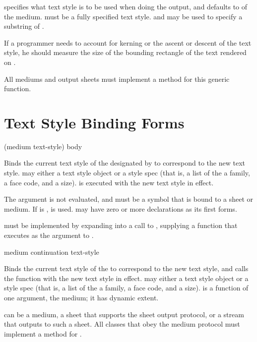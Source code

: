  specifies what text style is to be used when doing the output,
and defaults to  of the medium.  
must be a fully specified text style.   and  may be used to
specify a substring of .

If a programmer needs to account for kerning or the ascent or descent of the
text style, he should measure the size of the bounding rectangle of the text
rendered on .

All mediums and output sheets must implement a method for this generic function.


\section {Text Style Binding Forms}

 {(medium text-style) \body body}

Binds the current text style of the  designated by  to
correspond to the new text style.   may either a text style
object or a style spec (that is, a list of the a family, a face code, and a
size).   is executed with the new text style in effect.

The  argument is not evaluated, and must be a symbol that is bound
to a sheet or medium.  If  is ,  is
used.   may have zero or more declarations as its first forms.

 must be implemented by expanding into a call to
, supplying a function that executes  as
the  argument to .

 {medium continuation text-style}

Binds the current text style of the   to correspond to
the new text style, and calls the function  with the new text
style in effect.   may either a text style object or a style
spec (that is, a list of the a family, a face code, and a size).  
is a function of one argument, the medium; it has dynamic extent.

 can be a medium, a sheet that supports the sheet output protocol,
or a stream that outputs to such a sheet.  All classes that obey the medium
protocol must implement a method for .


